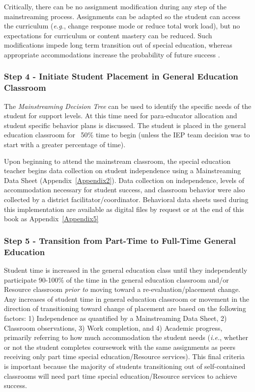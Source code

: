 \documentclass[twoside]{article}
\begin{document}
Critically, there can be no assignment modification during any step of the mainstreaming process. Assignments can be adapted so the student can access the curriculum (\textit{e.g.}, change response mode or reduce total work load), but no expectations for curriculum or content mastery can be reduced. Such modifications impede long term transition out of special education, whereas appropriate accommodations increase the probability of future success \parencite{fisher2003special,fuchs2003responsiveness,hollenbeck1998teachers}.

\subsubsection{Step 4 - Initiate Student Placement in General Education Classroom}
The \textit{Mainstreaming Decision Tree} can be used to identify the specific needs of the student for support levels. At this time need for para-educator allocation and student specific behavior plans is discussed. The student is placed in the general education classroom for ~50\% time to begin (unless the IEP team decision was to start with a greater percentage of time).

Upon beginning to attend the mainstream classroom, the special education teacher begins data collection on student independence using a Mainstreaming Data Sheet (Appendix~\ref{Appendix2}). Data collection on independence, levels of accommodation necessary for student success, and classroom behavior were also collected by a district facilitator/coordinator. Behavioral data sheets used during this implementation are available as digital files by request or at the end of this book as Appendix~\ref{Appendix5}

\subsubsection{Step 5 - Transition from Part-Time to Full-Time General Education}
Student time is increased in the general education class until they independently participate 90-100\% of the time in the general education classroom and/or Resource classroom \textit{prior to} moving toward a re-evaluation/placement change. Any increases of student time in general education classroom or movement in the direction of transitioning toward change of placement are based on the following factors: 1) Independence as quantified by a Mainstreaming Data Sheet, 2) Classroom observations, 3) Work completion, and 4) Academic progress, primarily referring to how much accommodation the student needs (\textit{i.e.}, whether or not the student completes coursework with the same assignments as peers receiving only part time special education/Resource services). This final criteria is important because the majority of students transitioning out of self-contained classrooms will need part time special education/Resource services to achieve success.
\end{document}
